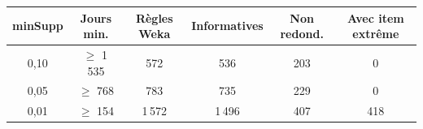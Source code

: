 \footnotesize
\begin{tabular}{cccccc}
\toprule
\rowcolor{NuitBleue!90}
\color{white}\textbf{minSupp} & \color{white}\textbf{Jours min.} & \color{white}\textbf{Règles Weka} & \color{white}\textbf{Informatives} & \color{white}\textbf{Non redond.} & \color{white}\textbf{Avec item extrême} \\
\midrule
0,10 & $\geq$ 1\,535 & 572 & 536 & 203 & 0 \\
0,05 & $\geq$ 768 & 783 & 735 & 229 & 0 \\
0,01 & $\geq$ 154 & 1\,572 & 1\,496 & 407 & 418 \\
\bottomrule
\end{tabular}
